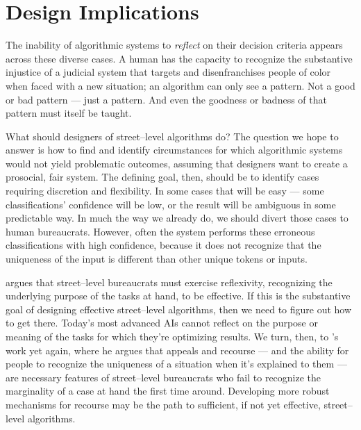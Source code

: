 \documentclass[street-level_algorithms]{subfiles}
\begin{document}
\section{Design Implications}

The inability of algorithmic systems to
\textit{reflect} on their decision criteria
appears across these diverse cases.
A human has the capacity to recognize
the substantive injustice of
a judicial system that targets and disenfranchises people of color when faced with a new situation;
an algorithm can only see a pattern.
Not a good or bad pattern --- just a pattern.
And even the goodness or badness of that pattern must itself be taught.


What should designers of street--level algorithms do?
The question we hope to answer is how to find and identify circumstances
for which algorithmic systems would not yield problematic outcomes,
assuming that designers want to create a prosocial, fair system.
The defining goal, then, should be to identify cases requiring discretion and flexibility.
In some cases that will be easy
--- some classifications' confidence will be low, or
the result will be ambiguous in some predictable way.
In much the way we already do, we should divert those cases to human bureaucrats.
However, often the system performs these erroneous classifications with high confidence, because
it does not recognize that the uniqueness of the input is different than other unique tokens or inputs.

\citeauthor{lipsky1983street} argues that street--level bureaucrats must exercise reflexivity,
recognizing the underlying purpose of the tasks at hand, to be effective.
If this is the substantive goal of designing effective street--level algorithms, then we need to figure out how to get there.
Today's most advanced AIs cannot reflect on the purpose or meaning of the tasks for which they're optimizing results.
We turn, then, to \citeauthor{lipsky1983street}'s work yet again, where
he argues that appeals and recourse
--- and the ability for people to recognize the uniqueness of a situation when it's explained to them ---
are necessary features of street--level bureaucrats who fail to recognize the marginality of a case at hand the first time around.
Developing more robust mechanisms for recourse may be the path to sufficient, if not yet effective, street--level algorithms.
\end{document}
